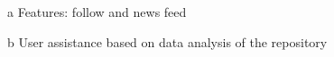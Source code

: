 \begin{table*}[h]
\begin{threeparttable}
\begin{tabular}{c|c|c|c|c|c|c|c|c|c|cc}
\end{tabular}

\begin{tablenotes}
      \small
       \item[a] Features: follow and news feed
      \item[b] User assistance based on data analysis of the repository
\end{tablenotes}
\end{threeparttable}
\end{table*}

